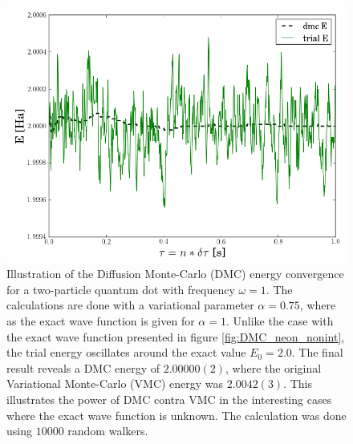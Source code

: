 \begin{figure}[h]
 \begin{center}
  \includegraphics[scale=0.5]{../Graphics/DMC_notExactWF.png}
  \caption{Illustration of the Diffusion Monte-Carlo (DMC) energy convergence for a two-particle quantum dot with frequency $\omega=1$. The calculations are done with a variational parameter $\alpha=0.75$, where as the exact wave function is given for $\alpha=1$. Unlike the case with the exact wave function presented in figure \ref{fig:DMC_neon_nonint}, the trial energy oscillates around the exact value $E_0 = 2.0$. The final result reveals a DMC energy of $2.00000(2)$, where the original Variational Monte-Carlo (VMC) energy was $2.0042(3)$. This illustrates the power of DMC contra VMC in the interesting cases where the exact wave function is unknown. The calculation was done using $10000$ random walkers.}
  \label{fig:DMC_nonExactWF}
 \end{center}
\end{figure}